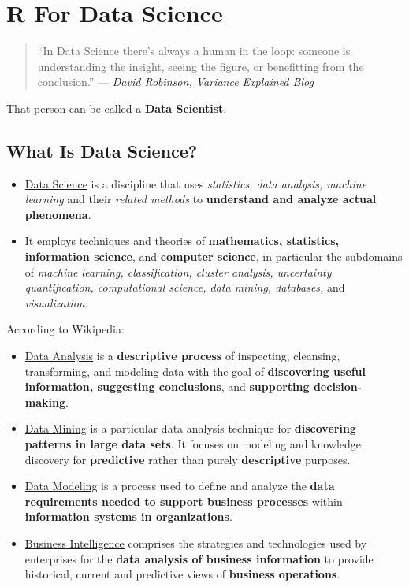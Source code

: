 \documentclass[]{book}
\theoremstyle{definition}
\theoremstyle{definition}
\theoremstyle{definition}
\theoremstyle{remark}
\begin{document}
\hypertarget{r-for-data-science}{%
\chapter{R For Data Science}\label{r-for-data-science}}

\begin{quote}
``In Data Science there's always a human in the loop: someone is
understanding the insight, seeing the figure, or benefitting from the
conclusion.'' ---
\href{http://varianceexplained.org/r/ds-ml-ai/}{\emph{David Robinson,
Variance Explained Blog}}
\end{quote}

That person can be called a \textbf{Data Scientist}.

\hypertarget{what-is-data-science}{%
\section{What Is Data Science?}\label{what-is-data-science}}

\begin{itemize}
\item
  \href{https://en.wikipedia.org/wiki/Data_science}{Data Science} is a
  discipline that uses \emph{statistics, data analysis, machine
  learning} and their \emph{related methods} to \textbf{understand and
  analyze actual phenomena}.
\item
  It employs techniques and theories of \textbf{mathematics, statistics,
  information science}, and \textbf{computer science}, in particular the
  subdomains of \emph{machine learning, classification, cluster
  analysis, uncertainty quantification, computational science, data
  mining, databases,} and \emph{visualization}.
\end{itemize}

According to Wikipedia:

\begin{itemize}
\item
  \href{https://en.wikipedia.org/wiki/Data_analysis}{Data Analysis} is a
  \textbf{descriptive process} of inspecting, cleansing, transforming,
  and modeling data with the goal of \textbf{discovering useful
  information, suggesting conclusions}, and \textbf{supporting
  decision-making}.
\item
  \href{https://en.wikipedia.org/wiki/Data_mining}{Data Mining} is a
  particular data analysis technique for \textbf{discovering patterns in
  large data sets}. It focuses on modeling and knowledge discovery for
  \textbf{predictive} rather than purely \textbf{descriptive} purposes.
\item
  \href{https://en.wikipedia.org/wiki/Data_modeling}{Data Modeling} is a
  process used to define and analyze the \textbf{data requirements
  needed to support business processes} within \textbf{information
  systems in organizations}.
\item
  \href{https://en.wikipedia.org/wiki/Business_intelligence}{Business
  Intelligence} comprises the strategies and technologies used by
  enterprises for the \textbf{data analysis of business information} to
  provide historical, current and predictive views of \textbf{business
  operations}.
\end{itemize}
\end{document}
